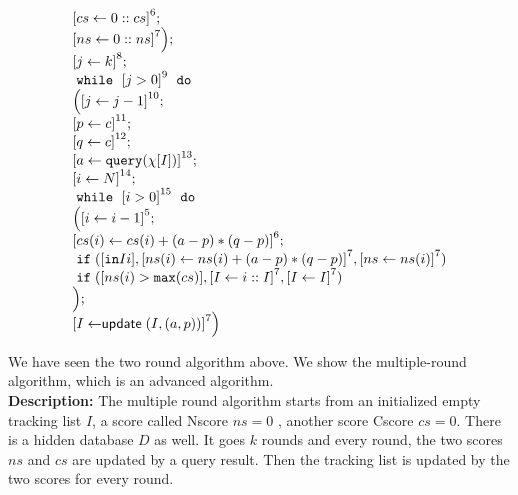 \begin{example}
\[\begin{array}{l}
     \clabel{\assign{cs}{0::cs}}^6; \\
     \clabel{\assign{ns}{0::ns}}^7
     \Big); \\
     \clabel{\assign{j}{k}}^{8} ;\\
     \ewhile ~ \clabel{j > 0}^{9} ~ \edo ~ \\
    \Big(
    \clabel{\assign{j}{j-1}}^{10} ;\\
    \left[p \leftarrow c \right]^{11}; \\
    \left[q \leftarrow c \right]^{12}; \\
    \left[ a \leftarrow \query (\chi[I]) \right]^{13};\\
    \clabel{\assign{i}{N}}^{14} ; \\
    \ewhile ~ \clabel{i > 0}^{15} ~ \edo ~ \\
    \Big(
    \clabel{\assign{i}{i-1}}^{5} ;\\
    \clabel{\assign{cs(i)}{cs(i) + (a - p) * (q - p)}}^6; \\
    \eif (\clabel{\kw{in} I i}, \clabel{\assign{ns(i)}{{ns(i) + (a - p) * (q - p)}}}^7,
    \clabel{\assign{ns}{ns(i)}}^7    ) \\
    \eif (\clabel{ns(i) > \kw{max}(cs)}, 
    \clabel{\assign{I}{i::I}}^7,
    \clabel{\assign{I}{I}}^7    ) \\
    \Big); \\
   \left[I \leftarrow \mathrel{\mathsf{update}} ( {I}, (a, p))  \right]^7
    \Big) 
\end{array}
\]
%
\end{example}
  We have seen the two round algorithm above. We show the multiple-round algorithm, which is an advanced algorithm.
 \\
\textbf{Description:}
The multiple round algorithm starts from an initialized empty tracking list $I$, a score called Nscore $ns=0$ , another score Cscore $cs=0$.
There is a hidden database $D$ as well.
It goes $k$ rounds and every round, the two scores $ns$ and $cs$ are updated by a query result. 
Then the tracking list is updated by the two scores for every round.  
